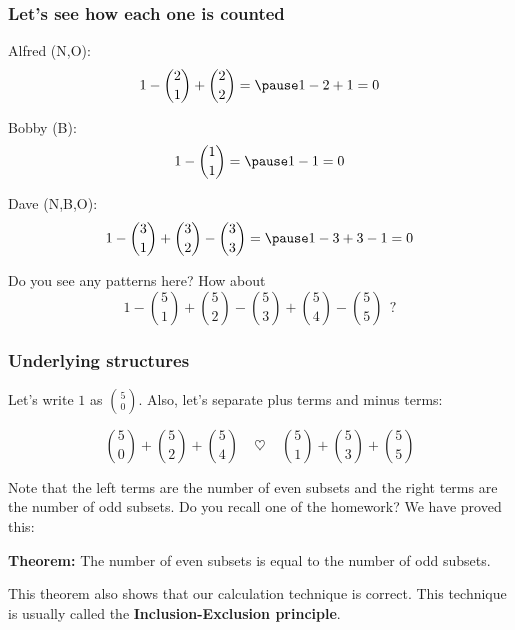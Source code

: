 \begin{frame}\frametitle{Let's see how each one is counted}
  Alfred (N,O): \pause $$1 - {2\choose 1} + {2\choose 2} = \pause 1 - 2 + 1 = 0$$

  Bobby (B): \pause $$1 - {1\choose 1} = \pause 1 - 1 = 0$$

  Dave (N,B,O): \pause $$1 - {3\choose 1} + {3\choose 2} - {3\choose 3} = \pause 1 - 3 + 3 - 1 = 0$$

  \pause

  Do you see any patterns here?
  \pause
  How about $$1 - {5\choose 1} + {5\choose 2} - {5\choose 3} + {5\choose 4} - {5\choose 5}\ \ ?$$
\end{frame}

\begin{frame}\frametitle{Underlying structures}
  Let's write $1$ as ${5\choose 0}$.  Also, let's separate plus terms
  and minus terms:

  $${5\choose 0} + {5\choose 2} + {5\choose 4}
  \ \ \ \ \ \heartsuit \ \ \ \ \
  {5\choose 1} + {5\choose 3} + {5\choose 5}$$

  \pause
  \vspace{0.1in}
  Note that the left terms are the number of even subsets and the
  right terms are the number of odd subsets.  Do you recall one of the
  homework? \pause We have proved this:

  \begin{tcolorbox}
    {\bf Theorem:} The number of even subsets is equal to the number
    of odd subsets.
  \end{tcolorbox}

  This theorem also shows that our calculation technique is correct.
  This technique is usually called the {\bf Inclusion-Exclusion
    principle}.
\end{frame}
